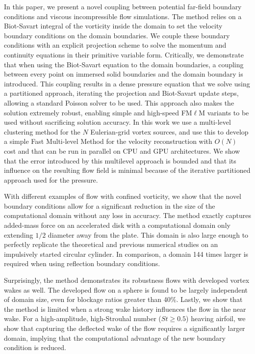 \documentclass[final,1p,times]{elsarticle}
\begin{document}
In this paper, we present a novel coupling between potential far-field boundary conditions and viscous incompressible flow simulations. The method relies on a Biot-Savart integral of the vorticity inside the domain to set the velocity boundary conditions on the domain boundaries. We couple these boundary conditions with an explicit projection scheme to solve the momentum and continuity equations in their primitive variable form. Critically, we demonstrate that when using the Biot-Savart equation to the domain boundaries, a coupling between every point on immersed solid boundaries and the domain boundary is introduced. This coupling results in a dense pressure equation that we solve using a partitioned approach, iterating the projection and Biot-Savart update steps, allowing a standard Poisson solver to be used. This approach also makes the solution extremely robust, enabling simple and high-speed FM$\ell$M variants to be used without sacrificing solution accuracy. In this work we use a multi-level clustering method for the $N$ Eulerian-grid vortex sources, and use this to develop a simple Fast Multi-level Method for the velocity reconstruction with $O(N)$ cost and that can be run in parallel on CPU and GPU architectures. We show that the error introduced by this multilevel approach is bounded and that its influence on the resulting flow field is minimal because of the iterative partitioned approach used for the pressure.

With different examples of flow with confined vorticity, we show that the novel boundary conditions allow for a significant reduction in the size of the computational domain without any loss in accuracy. The method exactly captures added-mass force on an accelerated disk with a computational domain only extending $1/2$ diameter away from the plate. This domain is also large enough to perfectly replicate the theoretical and previous numerical studies on an impulsively started circular cylinder. In comparison, a domain 144 times larger is required when using reflection boundary conditions.

Surprisingly, the method demonstrates its robustness flows with developed vortex wakes as well. The developed flow on a sphere is found to be largely independent of domain size, even for blockage ratios greater than 40\%.  
Lastly, we show that the method is limited when a strong wake history influences the flow in the near wake. For a high-amplitude, high-Strouhal number ($St\ge0.5$) heaving airfoil, we show that capturing the deflected wake of the flow requires a significantly larger domain, implying that the computational advantage of the new boundary condition is reduced.
\end{document}
